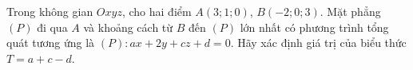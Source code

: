 \begin{ex}
Trong không gian $Oxyz$, cho hai điểm $A(3;1;0)$, $B(-2;0;3)$. Mặt phẳng $(P)$ đi qua $A$ và khoảng cách từ $B$ đến $(P)$ lớn nhất có phương trình tổng quát tương ứng là $(P)\colon ax+2y+cz+d=0$. Hãy xác định giá trị của biểu thức $T=a+c-d$.
\end{ex}
